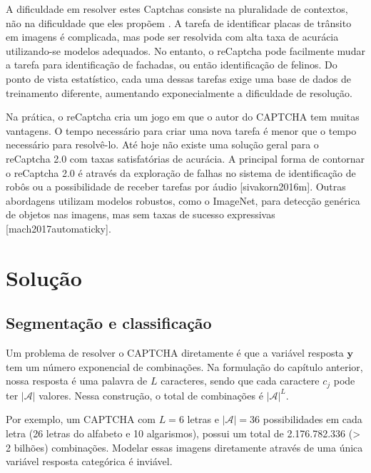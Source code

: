 \documentclass[12pt,]{report}
\begin{document}
A dificuldade em resolver estes Captchas consiste na pluralidade de contextos, não na dificuldade que eles propõem \citep{goodfellow2013multi}. A tarefa de identificar placas de trânsito em imagens é complicada, mas pode ser resolvida com alta taxa de acurácia utilizando-se modelos adequados. No entanto, o reCaptcha pode facilmente mudar a tarefa para identificação de fachadas, ou então identificação de felinos. Do ponto de vista estatístico, cada uma dessas tarefas exige uma base de dados de treinamento diferente, aumentando exponecialmente a dificuldade de resolução.

Na prática, o reCaptcha cria um jogo em que o autor do CAPTCHA tem muitas vantagens. O tempo necessário para criar uma nova tarefa é menor que o tempo necessário para resolvê-lo. Até hoje não existe uma solução geral para o reCaptcha 2.0 com taxas satisfatórias de acurácia. A principal forma de contornar o reCaptcha 2.0 é através da exploração de falhas no sistema de identificação de robôs ou a possibilidade de receber tarefas por áudio {[}sivakorn2016m{]}. Outras abordagens utilizam modelos robustos, como o ImageNet, para detecção genérica de objetos nas imagens, mas sem taxas de sucesso expressivas {[}mach2017automaticky{]}.

\hypertarget{results}{%
\chapter{Solução}\label{results}}

\hypertarget{segmentauxe7uxe3o-e-classificauxe7uxe3o}{%
\section{Segmentação e classificação}\label{segmentauxe7uxe3o-e-classificauxe7uxe3o}}

Um problema de resolver o CAPTCHA diretamente é que a variável resposta \(\mathbf y\) tem um número exponencial de combinações. Na formulação do capítulo anterior, nossa resposta é uma palavra de \(L\) caracteres, sendo que cada caractere \(c_j\) pode ter \(|\mathcal A|\) valores. Nessa construção, o total de combinações é \(|\mathcal A|^L\).

Por exemplo, um CAPTCHA com \(L=6\) letras e \(|\mathcal A| = 36\) possibilidades em cada letra (26 letras do alfabeto e 10 algarismos), possui um total de 2.176.782.336 (\textgreater{} 2 bilhões) combinações. Modelar essas imagens diretamente através de uma única variável resposta categórica é inviável.
\end{document}
